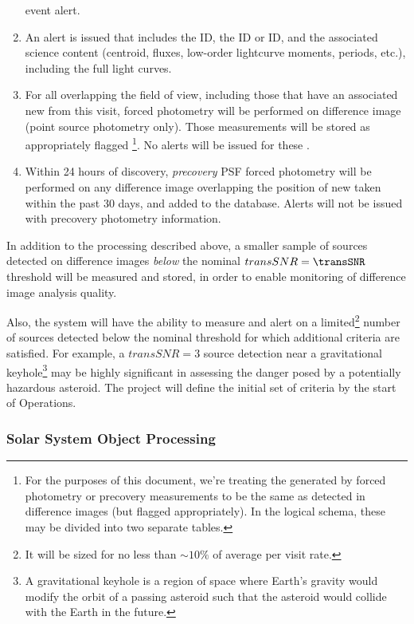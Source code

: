 \begin{enumerate}
event alert.
\item An alert is issued that includes the \DIASource ID, the \SSObject ID or \DIAObject ID, and the associated science content (centroid, fluxes, low-order lightcurve moments, periods, etc.), including the full light curves. 
\item For all \DIAObjects overlapping the field of view, including those that have an associated 
new \DIASource from this visit, forced photometry will be performed on difference image (point source photometry only). Those measurements will be stored as appropriately flagged \DIASources\footnote{For the purposes of this document, we're treating the \DIASources generated by forced photometry or precovery measurements to be the same as \DIASources detected in difference images (but flagged appropriately). In the logical schema, these may be divided into two separate tables.}.  No alerts will be issued for these \DIASources.
\item Within 24 hours of discovery, {\em precovery} PSF forced photometry will be performed on any difference image overlapping the position of new \DIAObjects taken within the past 30 days, and added to the database. Alerts will not be issued with precovery photometry information.
\end{enumerate}

In addition to the processing described above, a smaller sample of sources detected on difference images {\em below} the nominal $transSNR = \transSNR$ threshold will be measured and stored, in order to enable monitoring of difference image analysis quality.

Also, the system will have the ability to measure and alert on a limited\footnote{It will be sized for no less than $\sim 10\%$ of average \DIASource per visit rate.} number of sources detected below the nominal threshold for which additional criteria are satisfied. For example, a $transSNR = 3$ source detection near a gravitational keyhole\footnote{
A gravitational keyhole is a region of space where Earth's gravity would modify the orbit of a passing asteroid 
such that the asteroid would collide with the Earth in the future.}
may be highly significant in assessing the danger posed by a potentially hazardous asteroid. 
The project will define the initial set of criteria by the start of Operations.

\subsubsection{Solar System Object Processing}
\label{sec:ssProcessing}

